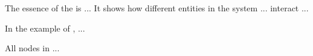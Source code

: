 The essence of the \ER is ... It shows how different entities in the system ... interact ...  


In the example of , ...

All nodes in \ER ...

% 
% 
% 
% 
% 
% 
% 

